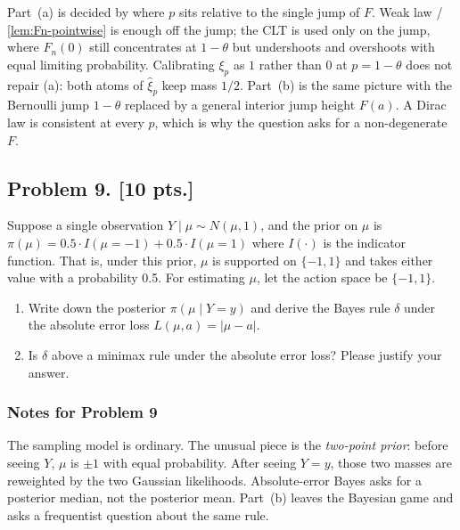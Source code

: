 \documentclass[11pt,a4paper]{article}
\begin{document}
\begin{remark}
\label{rem:p8-checks}
Part~(a) is decided by where \(p\) sits relative to the single jump of \(F\). Weak law / \cref{lem:Fn-pointwise} is enough off the jump; the CLT is used only on the jump, where \(F_n(0)\) still concentrates at \(1-\theta\) but undershoots and overshoots with equal limiting probability. Calibrating \(\xi_p\) as \(1\) rather than \(0\) at \(p=1-\theta\) does not repair (a): both atoms of \(\hat{\xi}_p\) keep mass \(1/2\). Part~(b) is the same picture with the Bernoulli jump \(1-\theta\) replaced by a general interior jump height \(F(a)\). A Dirac law is consistent at every \(p\), which is why the question asks for a non-degenerate \(F\).
\end{remark}

\subsection{Problem 9. [10 pts.]}
Suppose a single observation \( Y \mid \mu \sim N(\mu, 1) \), and the prior on \( \mu \) is \( \pi(\mu) = 0.5 \cdot I(\mu = -1) + 0.5 \cdot I(\mu = 1) \) where \( I(\cdot) \) is the indicator function. That is, under this prior, \( \mu \) is supported on \( \{-1, 1\} \) and takes either value with a probability 0.5. For estimating \( \mu \), let the action space be \( \{-1, 1\} \).
\begin{enumerate}[label=(\alph*)]
    \item Write down the posterior \( \pi(\mu \mid Y = y) \) and derive the Bayes rule \( \delta \) under the absolute error loss \( L(\mu, a) = |\mu - a| \).
    \item Is \( \delta \) above a minimax rule under the absolute error loss? Please justify your answer.
\end{enumerate}

\setcounter{section}{9}
\setcounter{definition}{0}

\subsubsection{Notes for Problem 9}

The sampling model is ordinary. The unusual piece is the \emph{two-point prior}: before seeing \(Y\), \(\mu\) is \(\pm 1\) with equal probability. After seeing \(Y=y\), those two masses are reweighted by the two Gaussian likelihoods. Absolute-error Bayes asks for a posterior median, not the posterior mean. Part~(b) leaves the Bayesian game and asks a frequentist question about the same rule.
\end{document}
